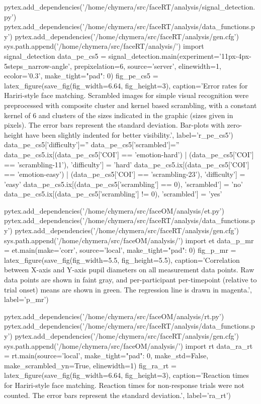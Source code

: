 \begin{pycode}[pe_cs5]
pytex.add_dependencies('/home/chymera/src/faceRT/analysis/signal_detection.py')
pytex.add_dependencies('/home/chymera/src/faceRT/analysis/data_functions.py')
pytex.add_dependencies('/home/chymera/src/faceRT/analysis/gen.cfg')
sys.path.append('/home/chymera/src/faceRT/analysis/')
import signal_detection
data_pe_cs5 = signal_detection.main(experiment='11px-4px-5steps_narrow-angle', prepixelation=6, source='server', elinewidth=1, ecolor='0.3', make_tight={"pad": 0})
fig_pe_cs5 = latex_figure(save_fig(fig_width=6.64, fig_height=3), caption='Error rates for Hariri-style face matching. Scrambled images for simple visual recognition were preprocessed with composite cluster and kernel based scrambling, with a constant kernel of \SI{6}{\pixel} and clusters of the sizes indicated in the graphic (sizes given in pixels). The error bars represent the standard deviation. Bar-plots with zero-height have been slightly indented for better visibility.', label='r_pe_cs5')
data_pe_cs5['difficulty']=''
data_pe_cs5['scrambled']=''
data_pe_cs5.ix[(data_pe_cs5['COI'] == 'emotion-hard') | (data_pe_cs5['COI'] == 'scrambling-11'), 'difficulty'] = 'hard'
data_pe_cs5.ix[(data_pe_cs5['COI'] == 'emotion-easy') | (data_pe_cs5['COI'] == 'scrambling-23'), 'difficulty'] = 'easy'
data_pe_cs5.ix[(data_pe_cs5['scrambling'] == 0), 'scrambled'] = 'no'
data_pe_cs5.ix[(data_pe_cs5['scrambling'] != 0), 'scrambled'] = 'yes'
\end{pycode}
\begin{pycode}[p_mr]
pytex.add_dependencies('/home/chymera/src/faceOM/analysis/et.py')
pytex.add_dependencies('/home/chymera/src/faceRT/analysis/data_functions.py')
pytex.add_dependencies('/home/chymera/src/faceRT/analysis/gen.cfg')
sys.path.append('/home/chymera/src/faceOM/analysis/')
import et
data_p_mr = et.main(make='corr', source='local', make_tight={"pad": 0})
fig_p_mr = latex_figure(save_fig(fig_width=5.5, fig_height=5.5), caption='Correlation between X-axis and Y-axis pupil diameters on all measurement data points. Raw data points are shown in faint gray, and per-participant per-timepoint (relative to trial onset) means are shown in green. The regression line is drawn in magenta.', label='p_mr')
\end{pycode}
\begin{pycode}[ra_rt]
pytex.add_dependencies('/home/chymera/src/faceOM/analysis/rt.py')
pytex.add_dependencies('/home/chymera/src/faceRT/analysis/data_functions.py')
pytex.add_dependencies('/home/chymera/src/faceRT/analysis/gen.cfg')
sys.path.append('/home/chymera/src/faceOM/analysis/')
import rt
data_ra_rt = rt.main(source='local', make_tight={"pad": 0}, make_std=False, make_scrambled_yn=True, elinewidth=1)
fig_ra_rt = latex_figure(save_fig(fig_width=6.64, fig_height=3), caption='Reaction times for Hariri-style face matching. Reaction times for non-response trials were not counted. The error bars represent the standard deviation.', label='ra_rt')
\end{pycode}
